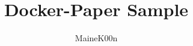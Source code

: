 \documentclass[a4paper]{jsarticle}
\begin{document}
\title{Docker-Paper Sample}
\author{MaineK00n}
\maketitle


\end{document}
